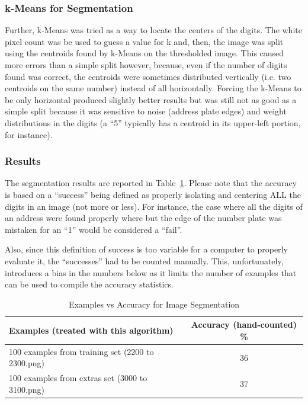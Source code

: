 \documentclass{article} %
\begin{document}
\subsubsection{k-Means for Segmentation}
Further, k-Means was tried as a way to locate the centers of the digits. The white pixel count was be used to guess a value for k and, then, the image was split using the centroids found by k-Means on the thresholded image. This caused more errors than a simple split however, because, even if the number of digits found was correct, the centroids were sometimes distributed vertically (i.e. two centroids on the same number) instead of all horizontally. Forcing the k-Means to be only horizontal produced slightly better results but was still not as good as a simple split because it was sensitive to noise (address plate edges) and weight distributions in the digits (a “5” typically has a centroid in its upper-left portion, for instance).

\subsubsection{Results}
The segmentation results are reported in Table~\ref{table:segmentation}. Please note that the accuracy is based on a “success” being defined as properly isolating and centering ALL the digits in an image (not more or less). For instance, the case where all the digits of an address were found properly where but the edge of the number plate was mistaken for an “1” would be considered a “fail”. 

Also, since this definition of success is too variable for a computer to properly evaluate it, the “successes” had to be counted manually. This, unfortunately, introduces a bias in the numbers below as it limits the number of examples that can be used to compile the accuracy statistics.

\begin{center}
	\begin{table}[h]
  		\begin{tabular}{ | l || c ||}
	    	\hline
		    Examples (treated with this algorithm) & Accuracy (hand-counted) \% \\ \hline \hline
		    100 examples from training set (2200 to 2300.png) &  36 \\ \hline
		    100 examples from extras set (3000 to 3100.png) & 37 \\
		    \hline
        \end{tabular}
		  \caption{Examples vs Accuracy for Image Segmentation}
		  \label{table:segmentation}
  	\end{table}
\end{center}
\end{document}
